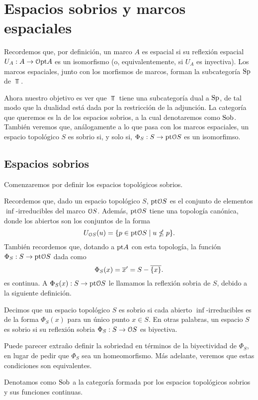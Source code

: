 \chapter{Espacios sobrios y marcos espaciales}

Recordemos que, por definición, un marco $A$ es espacial si
su reflexión espacial $U_A:A\to\cal O\pt A$ es un isomorfismo
(o, equivalentemente, si $U_A$ es inyectiva).
Los marcos espaciales, junto con los morfismos de marcos,
forman la subcategoría $\Sp$ de $\Top$.

Ahora nuestro objetivo es ver que $\Top$ tiene una subcategoría
dual a $\Sp$, de tal modo que la dualidad
está dada por la restricción de la adjunción.
La categoría que queremos es la de los espacios sobrios,
a la cual denotaremos como $\Sob$.
También veremos que, análogamente a lo que pasa
con los marcos espaciales, un espacio topológico $S$ es sobrio
si, y solo si, $\Phi_S:S\to\pt\cal OS$ es un isomorfimso.

\section{Espacios sobrios}
Comenzaremos por definir los espacios topológicos sobrios.

Recordemos que, dado un espacio topológico $S$,
$\pt\cal OS$ es el conjunto de elementos
$\inf$-irreducibles del marco $\cal OS$.
Además, $\pt\cal OS$ tiene una topología canónica,
donde los abiertos son los conjuntos de la forma
\[
    U_{\cal OS}(u) = \{p\in\pt\cal OS \mid u\nleq p\}
.\]
También recordemos que, dotando a $\pt A$ con esta topología,
la función $\Phi_S:S\to\pt\cal OS$ dada como
\[
    \Phi_S(x) = \ol{x}' = S-\ol{\{x\}}.
\]
es continua.
A $\Phi_S(x):S\to\pt\cal OS$ le llamamos
la reflexión sobria de $S$, debido a la siguiente definición.

\begin{definition}
    Decimos que un espacio topológico $S$ es sobrio si
    cada abierto $\inf$-irreducibles es de la forma
    $\Phi_S(x)$ para un único punto $x\in S$.
    En otras palabras, un espacio $S$ es sobrio
    si su reflexión sobria $\Phi_S:S\to\cal OS$ es biyectiva.
    
    Puede parecer extraño definir la sobriedad en términos de
    la biyectividad de $\Phi_S$, en lugar de pedir que $\Phi_S$
    sea un homeomorfismo.
    Más adelante, veremos que estas condiciones son equivalentes.
    
    Denotamos como $\Sob$ a la categoría formada por
    los espacios topológicos sobrios y sus funciones continuas.
\end{definition}

